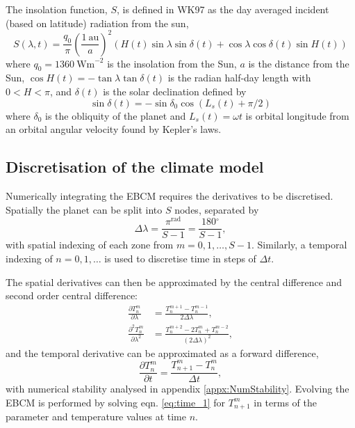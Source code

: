 \documentclass[12pt, onecolumn]{revtex4-2}    %
\newcommand{\radians}{\ensuremath{^{\text{rad}}}}
\newcommand{\degrees}{\ensuremath{^{\circ}}}
\newcommand{\partialderiv}[2]{\frac{\partial {#1}}{\partial {#2}}}
\newcommand{\partialderivsecnd}[2]{\frac{\partial^2 {#1}}{\partial {#2}^2}}
\begin{document}
The insolation function, $S$, is defined in WK97 as the day averaged incident (based on latitude) radiation from the sun,
$$
    S(\lambda, t) = \frac{q_0}{\pi} \left(\frac{1 \ \text{au}}{a}\right)^2 (H(t) \sin{\lambda} \sin{\delta(t)} + \cos{\lambda} \cos{\delta(t)} \sin{H(t)})
$$
where $q_0=1360 \ \text{Wm}^{-2}$ is the insolation from the Sun,
$a$ is the distance from the Sun,
$\cos H(t) = -\tan \lambda \tan \delta(t)$ is the radian half-day length with $0 < H < \pi$,
and $\delta(t)$ is the solar declination defined by
$$
    \sin \delta(t) = -\sin \delta_0 \cos(L_s(t) + \pi/2)
$$
where $\delta_0$ is the obliquity of the planet and $L_s(t) = \omega t$ is orbital longitude from an orbital angular velocity found by Kepler's laws.

\subsection{Discretisation of the climate model} \label{ssec:DiscretisationPDE}
Numerically integrating the EBCM requires the derivatives to be discretised.
Spatially the planet can be split into $S$ nodes, separated by
\begin{equation}
    \Delta\lambda = \frac{\pi\radians}{S-1} = \frac{180\degrees}{S-1},
\end{equation}
with spatial indexing of each zone from $m=0, 1, \dots, S-1$.
Similarly, a temporal indexing of $n=0, 1, \dots$ is used to discretise time in steps of $\Delta t$.

The spatial derivatives can then be approximated by the central difference and second order central difference:
\begin{align}
    \partialderiv{T^m_n}{\lambda}      & = \frac{T^{m+1}_n - T^{m-1}_n}{2 \Delta\lambda},     \label{eq:space_1}        \\
    \partialderivsecnd{T^m_n}{\lambda} & = \frac{T^{m+2}_n -2T^m_n + T^{m-2}_n}{(2 \Delta\lambda)^2},\label{eq:space_2}
\end{align}
and the temporal derivative can be approximated as a forward difference,
\begin{equation} \label{eq:time_1}
    \partialderiv{T^m_n}{t} = \frac{T^m_{n+1} - T^m_n}{\Delta t},
\end{equation}
with numerical stability analysed in appendix \ref{appx:NumStability}.
Evolving the EBCM is performed by solving eqn. \ref{eq:time_1} for $T^m_{n+1}$ in terms of the parameter and temperature values at time $n$.
\end{document}
